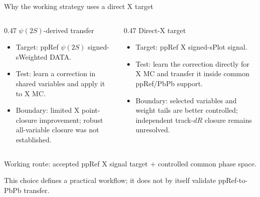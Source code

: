 \begin{frame}[label=p8]{Why the working strategy uses a direct X target}
  \small
  \begin{columns}[T,onlytextwidth]
    \begin{column}{0.47\textwidth}
      \centering
      $\psi(2S)$-derived transfer
      \raggedright
      \begin{itemize}
        \setlength{\itemsep}{0.55em}
        \item Target: ppRef $\psi(2S)$ signed-sWeighted DATA.
        \item Test: learn a correction in shared variables and apply it to X MC.
        \item Boundary: limited X point-closure improvement; robust all-variable closure was not established.
      \end{itemize}
    \end{column}

    \begin{column}{0.47\textwidth}
      \centering
      Direct-X target
      \raggedright
      \begin{itemize}
        \setlength{\itemsep}{0.55em}
        \item Target: ppRef X signed-sPlot signal.
        \item Test: learn the correction directly for X MC and transfer it inside common ppRef/PbPb support.
        \item Boundary: selected variables and weight tails are better controlled; independent track-$dR$ closure remains unresolved.
      \end{itemize}
    \end{column}
  \end{columns}

  \vspace{0.6em}
  \centering
  Working route: accepted ppRef X signal target + controlled common phase space.

  \vfill
  This choice defines a practical workflow; it does not by itself validate ppRef-to-PbPb transfer.
\end{frame}


